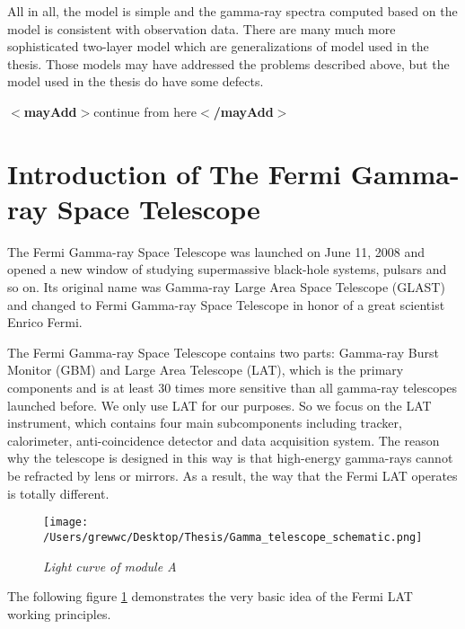 \documentclass[12pt]{report}
\newcommand{\mycaption}[1]{\caption{\textit{\footnotesize #1}}}
\newcommand{\mayAdd}[1]{
  $<$\textbf{mayAdd}$>$#1$<$\textbf{/mayAdd}$>$
}
\begin{document}
            All in all, the model is simple and the gamma-ray spectra computed based on the model is 
            consistent with observation data. There are many much more sophisticated two-layer model 
            which are generalizations of model used in the thesis. Those models may have addressed the 
            problems described above, but the model used in the thesis do have some defects. 

          \mayAdd{continue from here}

        \section{Introduction of The Fermi Gamma-ray Space Telescope}
          The Fermi Gamma-ray Space Telescope was launched on June 11, 2008 and opened a new window of studying
          supermassive black-hole systems, pulsars and so on. Its original name was Gamma-ray Large Area Space 
          Telescope (GLAST) and changed to Fermi Gamma-ray Space Telescope in honor of a great scientist 
          Enrico Fermi. 

          The Fermi Gamma-ray Space Telescope contains two parts: Gamma-ray Burst Monitor (GBM) and Large 
          Area Telescope (LAT), which is the primary components and is at least 30 times more sensitive than 
          all gamma-ray telescopes launched before. We only use LAT for our purposes. So we 
          focus on the LAT instrument, which contains four main subcomponents including tracker, calorimeter,
          anti-coincidence detector and data acquisition system. The reason why the telescope is designed in 
          this way is that high-energy gamma-rays cannot be refracted by lens or mirrors. As a result, the way
          that the Fermi LAT operates is totally different. 

        \begin{figure}[!ht]  
          \begin{minipage}{1\textwidth}
            \begin{center} 
                \texttt{[image: /Users/grewwc/Desktop/Thesis/Gamma\_telescope\_schematic.png]}
                \mycaption{Light curve of module A}
                \label{fig:fermi schematic}
            \end{center}
          \end{minipage}
        \end{figure}
        The following figure \ref{fig:fermi schematic} demonstrates the very basic idea of the Fermi LAT working
        principles. \\
\end{document}
